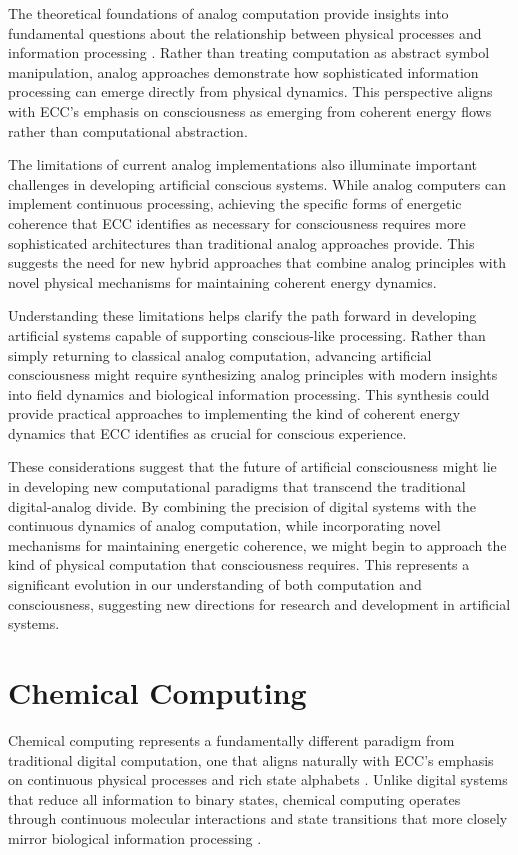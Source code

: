 \begin{refsection}
The theoretical foundations of analog computation provide insights into fundamental questions about the relationship between physical processes and information processing \cite{Zauner2005}. Rather than treating computation as abstract symbol manipulation, analog approaches demonstrate how sophisticated information processing can emerge directly from physical dynamics. This perspective aligns with ECC's emphasis on consciousness as emerging from coherent energy flows rather than computational abstraction.

The limitations of current analog implementations also illuminate important challenges in developing artificial conscious systems. While analog computers can implement continuous processing, achieving the specific forms of energetic coherence that ECC identifies as necessary for consciousness requires more sophisticated architectures than traditional analog approaches provide. This suggests the need for new hybrid approaches that combine analog principles with novel physical mechanisms for maintaining coherent energy dynamics.

Understanding these limitations helps clarify the path forward in developing artificial systems capable of supporting conscious-like processing. Rather than simply returning to classical analog computation, advancing artificial consciousness might require synthesizing analog principles with modern insights into field dynamics and biological information processing. This synthesis could provide practical approaches to implementing the kind of coherent energy dynamics that ECC identifies as crucial for conscious experience.

These considerations suggest that the future of artificial consciousness might lie in developing new computational paradigms that transcend the traditional digital-analog divide. By combining the precision of digital systems with the continuous dynamics of analog computation, while incorporating novel mechanisms for maintaining energetic coherence, we might begin to approach the kind of physical computation that consciousness requires. This represents a significant evolution in our understanding of both computation and consciousness, suggesting new directions for research and development in artificial systems.

\section{Chemical Computing}

Chemical computing represents a fundamentally different paradigm from traditional digital computation, one that aligns naturally with ECC's emphasis on continuous physical processes and rich state alphabets \cite{Adamatzky2021}. Unlike digital systems that reduce all information to binary states, chemical computing operates through continuous molecular interactions and state transitions that more closely mirror biological information processing \cite{Benenson2019}.


\end{refsection}
